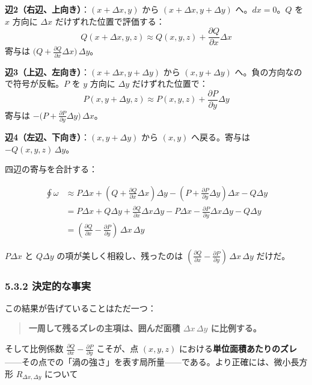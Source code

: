 \documentclass[a4paper,12pt,openany]{book}
\begin{document}
\textbf{辺2（右辺、上向き）}：\((x+\Delta x, y)\) から
\((x+\Delta x, y+\Delta y)\) へ。\(dx=0\)。\(Q\) を \(x\) 方向に
\(\Delta x\) だけずれた位置で評価する：
\[Q(x+\Delta x, y, z) \approx Q(x, y, z) + \frac{\partial Q}{\partial x}\Delta x\]
寄与は
\(\bigl(Q + \frac{\partial Q}{\partial x}\Delta x\bigr)\,\Delta y\)。

\textbf{辺3（上辺、左向き）}：\((x+\Delta x, y+\Delta y)\) から
\((x, y+\Delta y)\) へ。負の方向なので符号が反転。\(P\) を \(y\) 方向に
\(\Delta y\) だけずれた位置で：
\[P(x, y+\Delta y, z) \approx P(x, y, z) + \frac{\partial P}{\partial y}\Delta y\]
寄与は
\(-\bigl(P + \frac{\partial P}{\partial y}\Delta y\bigr)\,\Delta x\)。

\textbf{辺4（左辺、下向き）}：\((x, y+\Delta y)\) から \((x, y)\)
へ戻る。寄与は \(-Q(x, y, z)\,\Delta y\)。

四辺の寄与を合計する：

\[\begin{aligned}
\oint \omega &\approx P\Delta x + (Q + \frac{\partial Q}{\partial x}\Delta x)\Delta y - (P + \frac{\partial P}{\partial y}\Delta y)\Delta x - Q\Delta y \\
&= P\Delta x + Q\Delta y + \frac{\partial Q}{\partial x}\Delta x\Delta y - P\Delta x - \frac{\partial P}{\partial y}\Delta x\Delta y - Q\Delta y \\
&= (\frac{\partial Q}{\partial x} - \frac{\partial P}{\partial y})\,\Delta x\,\Delta y
\end{aligned}\]

\(P\Delta x\) と \(Q\Delta y\) の項が美しく相殺し、残ったのは
\((\frac{\partial Q}{\partial x} - \frac{\partial P}{\partial y})\,\Delta x\,\Delta y\)
だけだ。

\hypertarget{ux6c7aux5b9aux7684ux306aux4e8bux5b9f}{%
\subsubsection{5.3.2
決定的な事実}\label{ux6c7aux5b9aux7684ux306aux4e8bux5b9f}}

この結果が告げていることはただ一つ：

\begin{quote}
\textbf{一周して残るズレの主項は、囲んだ面積 $\Delta x\,\Delta y$ に比例する。}
\end{quote}

そして比例係数
\(\frac{\partial Q}{\partial x} - \frac{\partial P}{\partial y}\)
こそが、点 \((x,y,z)\)
における\textbf{単位面積あたりのズレ}——その点での「渦の強さ」を表す局所量——である。より正確には、微小長方形
\(R_{\Delta x,\Delta y}\) について
\end{document}
